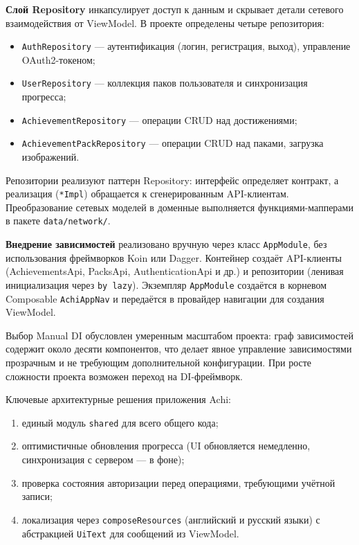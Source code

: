\documentclass[../main.tex]{subfiles}
\begin{document}
\textbf{Слой Repository} инкапсулирует доступ к данным и скрывает детали сетевого взаимодействия от ViewModel. В проекте определены четыре репозитория:
\begin{itemize}[leftmargin=*]
	\item \texttt{AuthRepository} --- аутентификация (логин, регистрация, выход), управление OAuth2-токеном;
	\item \texttt{UserRepository} --- коллекция паков пользователя и синхронизация прогресса;
	\item \texttt{AchievementRepository} --- операции CRUD над достижениями;
	\item \texttt{AchievementPackRepository} --- операции CRUD над паками, загрузка изображений.
\end{itemize}

Репозитории реализуют паттерн Repository: интерфейс определяет контракт, а реализация (\texttt{*Impl}) обращается к сгенерированным API-клиентам. Преобразование сетевых моделей в доменные выполняется функциями-мапперами в пакете \texttt{data/network/}.

\textbf{Внедрение зависимостей} реализовано вручную через класс \texttt{AppModule}, без использования фреймворков Koin или Dagger. Контейнер создаёт API-клиенты (AchievementsApi, PacksApi, AuthenticationApi и др.) и репозитории (ленивая инициализация через \texttt{by lazy}). Экземпляр \texttt{AppModule} создаётся в корневом Composable \texttt{AchiAppNav} и передаётся в провайдер навигации для создания ViewModel.

Выбор Manual DI обусловлен умеренным масштабом проекта: граф зависимостей содержит около десяти компонентов, что делает явное управление зависимостями прозрачным и не требующим дополнительной конфигурации. При росте сложности проекта возможен переход на DI-фреймворк.

Ключевые архитектурные решения приложения Achi:
\begin{enumerate}[leftmargin=*]
	\item единый модуль \texttt{shared} для всего общего кода;
	\item оптимистичные обновления прогресса (UI обновляется немедленно, синхронизация с сервером --- в фоне);
	\item проверка состояния авторизации перед операциями, требующими учётной записи;
	\item локализация через \texttt{composeResources} (английский и русский языки) с абстракцией \texttt{UiText} для сообщений из ViewModel.
\end{enumerate}
\end{document}
